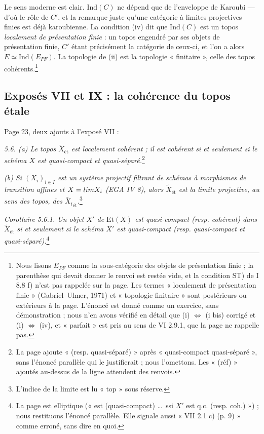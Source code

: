 \documentclass[11pt,a4paper]{article}
\begin{document}
Le sens moderne est clair. $\mathrm{Ind}(C)$ ne dépend que de l'enveloppe de
Karoubi --- d'où le rôle de $C'$, et la remarque juste qu'une catégorie à
limites projectives finies est déjà karoubienne. La condition (iv) dit que
$\mathrm{Ind}(C)$ est un topos \emph{localement de présentation finie} :
un topos engendré par ses objets de présentation finie, $C'$ étant
précisément la catégorie de ceux-ci, et l'on a alors
$E \simeq \mathrm{Ind}(E_{PF})$. La topologie de (ii) est la topologie
« finitaire », celle des topos cohérents.\footnote{Nous lisons $E_{PF}$
comme la sous-catégorie des objets de présentation finie ; la parenthèse qui
devait donner le renvoi est restée vide, et la condition ST) de I 8.8 f) n'est
pas rappelée sur la page. Les termes « localement de présentation finie »
(Gabriel--Ulmer, 1971) et « topologie finitaire » sont postérieurs ou
extérieurs à la page. L'énoncé est donné comme un exercice, sans
démonstration ; nous n'en avons vérifié en détail que (i) $\Leftrightarrow$
(i bis) corrigé et (i) $\Leftrightarrow$ (iv), et « parfait » est pris au
sens de VI 2.9.1, que la page ne rappelle pas.}

\subsection*{Exposés VII et IX : la cohérence du topos étale}

Page 23, deux ajouts à l'exposé VII :

\emph{5.6. (a) Le topos $\widetilde{X}_{\text{ét}}$ est localement cohérent ;
il est cohérent si et seulement si le schéma $X$ est quasi-compact et
quasi-séparé.}\footnote{La page ajoute « (resp. quasi-séparé) » après
« quasi-compact quasi-séparé », sans l'énoncé parallèle qui le justifierait ;
nous l'omettons. Les « (réf) » ajoutés au-dessus de la ligne attendent des
renvois.}

\emph{(b) Si $(X_i)_{i \in I}$ est un système projectif filtrant de schémas à
morphismes de transition affines et $X = \varprojlim X_i$ (EGA IV 8), alors
$\widetilde{X}_{\text{ét}}$ est la limite projective, au sens des topos, des
$\widetilde{X_i}_{\text{ét}}$.}\footnote{L'indice de la limite est lu « top »
sous réserve.}

\emph{Corollaire 5.6.1. Un objet $X'$ de $\mathrm{Et}(X)$ est quasi-compact
(resp. cohérent) dans $\widetilde{X}_{\text{ét}}$ si et seulement si le schéma
$X'$ est quasi-compact (resp. quasi-compact et quasi-séparé).}\footnote{La
page est elliptique (« est (quasi-compact) \ldots\ ssi $X'$ est q.c. (resp.
coh.) ») ; nous restituons l'énoncé parallèle. Elle signale aussi « VII 2.1
c) (p. 9) » comme erroné, sans dire en quoi.}
\end{document}
